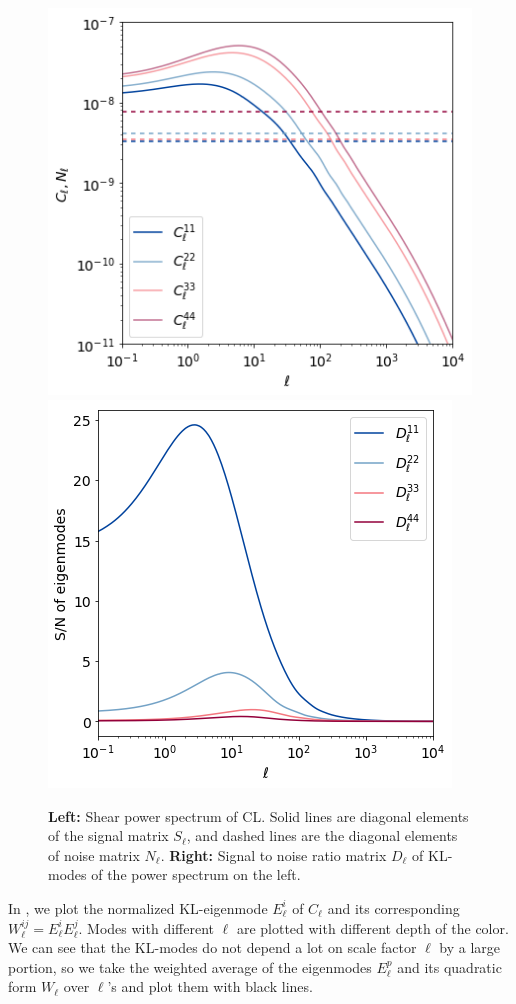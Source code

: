 \documentclass[twocolumn]{\docclass}
\begin{document}
	\begin{figure}
		\includegraphics[width=0.7\columnwidth]{Cl_pst.png}
		\qquad \qquad \qquad
		\includegraphics[width=0.7\columnwidth]{Dl_pst.png}
		\caption{\textbf{Left:} Shear power spectrum of CL. Solid lines are diagonal elements of the signal matrix $S_{\ell}$, and dashed lines are the diagonal elements of noise matrix $N_{\ell}$.
			\textbf{Right:} Signal to noise ratio matrix $D_\ell$ of KL-modes of the power spectrum on the left.  \label{fig:ClDl}}
	\end{figure}
	
	In , we plot the normalized KL-eigenmode $E_\ell^i$ of $C_{\ell}$ and its corresponding $W^{ij}_\ell=E_\ell^i E_\ell^j$. Modes with different $\ell$ are plotted with different depth of the color. We can see that the KL-modes do not depend a lot on scale factor $\ell$ by a large portion, so we take the weighted average of the eigenmodes $E_\ell^p$ and its quadratic form $W_\ell$ over $\ell$'s and plot them with black lines. 
	
\end{document}

